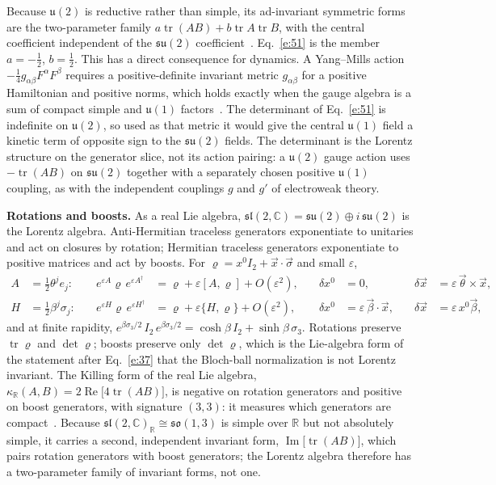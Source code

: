 \documentclass[10pt]{article}
\newcommand{\tr}{\operatorname{tr}}
\DeclareMathOperator{\Real}{Re}
\DeclareMathOperator{\Imag}{Im}
\begin{document}
Because $\mathfrak u(2)$ is reductive rather than simple, its ad-invariant symmetric forms are the two-parameter family $a\tr(AB)+b\tr A\tr B$, with the central coefficient independent of the $\mathfrak{su}(2)$ coefficient~\cite{nappi}. Eq.~\eqref{e:51} is the member $a=-\frac12$, $b=\frac12$. This has a direct consequence for dynamics. A Yang--Mills action $-\frac14g_{\alpha\beta}F^\alpha F^\beta$ requires a positive-definite invariant metric $g_{\alpha\beta}$ for a positive Hamiltonian and positive norms, which holds exactly when the gauge algebra is a sum of compact simple and $\mathfrak u(1)$ factors~\cite{weinberg,gellmann}. The determinant of Eq.~\eqref{e:51} is indefinite on $\mathfrak u(2)$, so used as that metric it would give the central $\mathfrak u(1)$ field a kinetic term of opposite sign to the $\mathfrak{su}(2)$ fields. The determinant is the Lorentz structure on the generator slice, not its action pairing: a $\mathfrak u(2)$ gauge action uses $-\tr(AB)$ on $\mathfrak{su}(2)$ together with a separately chosen positive $\mathfrak u(1)$ coupling, as with the independent couplings $g$ and $g'$ of electroweak theory.

\smallskip
\noindent\textbf{Rotations and boosts.} As a real Lie algebra, $\mathfrak{sl}(2,\mathbb C)=\mathfrak{su}(2)\oplus i\,\mathfrak{su}(2)$ is the Lorentz algebra. Anti-Hermitian traceless generators exponentiate to unitaries and act on closures by rotation; Hermitian traceless generators exponentiate to positive matrices and act by boosts. For $\varrho=x^0I_2+\vec x\cdot\vec\sigma$ and small $\varepsilon$,
\begin{equation}
\begin{aligned}
A&=\tfrac12\theta^je_j:&\quad e^{\varepsilon A}\varrho\,e^{\varepsilon A^\dagger}&=\varrho+\varepsilon[A,\varrho]+O(\varepsilon^2),&\quad \delta x^0&=0,&\quad \delta\vec x&=\varepsilon\,\vec\theta\times\vec x,\\
H&=\tfrac12\beta^j\sigma_j:&\quad e^{\varepsilon H}\varrho\,e^{\varepsilon H^\dagger}&=\varrho+\varepsilon\{H,\varrho\}+O(\varepsilon^2),&\quad \delta x^0&=\varepsilon\,\vec\beta\cdot\vec x,&\quad \delta\vec x&=\varepsilon\,x^0\vec\beta,
\end{aligned}\label{e:52}
\end{equation}
and at finite rapidity, $e^{\beta\sigma_3/2}\,I_2\,e^{\beta\sigma_3/2}=\cosh\beta\,I_2+\sinh\beta\,\sigma_3$. Rotations preserve $\tr\varrho$ and $\det\varrho$; boosts preserve only $\det\varrho$, which is the Lie-algebra form of the statement after Eq.~\eqref{e:37} that the Bloch-ball normalization is not Lorentz invariant. The Killing form of the real Lie algebra, $\kappa_{\mathbb R}(A,B)=2\Real\bigl[4\tr(AB)\bigr]$, is negative on rotation generators and positive on boost generators, with signature $(3,3)$: it measures which generators are compact~\cite{derdzinski}. Because $\mathfrak{sl}(2,\mathbb C)_{\mathbb R}\cong\mathfrak{so}(1,3)$ is simple over $\mathbb R$ but not absolutely simple, it carries a second, independent invariant form, $\Imag\bigl[\tr(AB)\bigr]$, which pairs rotation generators with boost generators; the Lorentz algebra therefore has a two-parameter family of invariant forms, not one.
\end{document}
